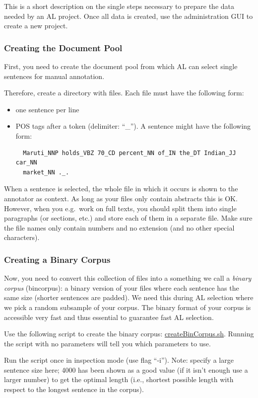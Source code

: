 \documentclass[DIV12,english,11pt,halfparskip]{scrartcl}
\begin{document}
\begin{appendix}
This is a short description on the single steps necessary to prepare
the data needed by an AL project. Once all data is created, use the
administration GUI to create a new project.

\subsubsection{Creating the Document Pool}
First, you need to create the document pool from which AL can select
single sentences for manual annotation.

Therefore, create a directory with files. Each file must have the
following form:
\begin{itemize}
\item one sentence per line
\item POS tags after a token (delimiter: ``\_''). A sentence might
  have the following form:
\begin{verbatim}
  Maruti_NNP holds_VBZ 70_CD percent_NN of_IN the_DT Indian_JJ car_NN
  market_NN ._.
\end{verbatim}
\end{itemize}

When a sentence is selected, the whole file in which it occurs is
shown to the annotator as context. As long as your files only contain
abstracts this is OK. However, when you e.g.\ work on full texts, you
should split them into single paragraphs (or sections, etc.) and store
each of them in a separate file. Make sure the file names only contain
numbers and no extension (and no other special characters).

\subsubsection{Creating a Binary Corpus}

Now, you need to convert this collection of files into a something we
call a \emph{binary corpus} (bincorpus): a binary version of your
files where each sentence has the same size (shorter sentences are
padded). We need this during AL selection where we pick a random
subsample of your corpus. The binary format of your corpus is
accessible very fast and thus essential to guarantee fast AL
selection.

Use the following script to create the binary corpus:
\url{createBinCorpus.sh}. Running the script with no parameters will
tell you which parameters to use.

Run the script once in inspection mode (use flag ``-i''). Note:
specify a large sentence size here; 4000 has been shown as a good
value (if it isn't enough use a larger number) to get the optimal
length (i.e., shortest possible length with respect to the longest
sentence in the corpus).


\end{appendix}
\end{document}
